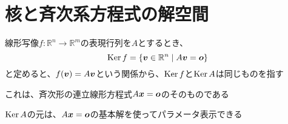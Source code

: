 \documentclass[../../../topic_linear-algebra]{subfiles}
\begin{document}
\sectionline
\section{核と斉次系方程式の解空間}

\br

線形写像$f\colon \mathbb{R}^n \to \mathbb{R}^m$の表現行列を$A$とするとき、
\begin{equation*}
  \operatorname{Ker} f = \{ \vb*{v} \in \mathbb{R}^n \mid A\vb*{v} = \vb*{o} \}
\end{equation*}
と定めると、$f(\vb*{v}) = A\vb*{v}$という関係から、$\operatorname{Ker} f$と$\operatorname{Ker} A$は同じものを指す

\br

これは、斉次形の連立線形方程式$A\vb*{x} = \vb*{o}$のそのものである

$\operatorname{Ker} A$の元は、$A\vb*{x} = \vb*{o}$の基本解を使ってパラメータ表示できる
\end{document}
